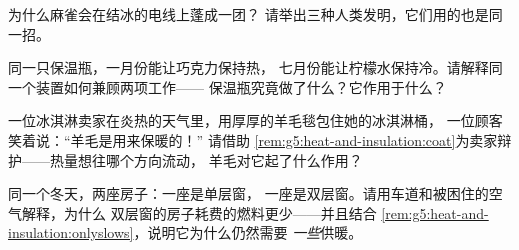 \begin{exercise}[$\star$]\label{exo:g5:heat-and-insulation:8}
为什么麻雀会在结冰的电线上蓬成一团？
请举出三种人类发明，它们用的也是同一招。
\end{exercise}

\begin{exercise}[$\star\star$]\label{exo:g5:heat-and-insulation:9}
同一只保温瓶，一月份能让巧克力保持热，
七月份能让柠檬水保持冷。请解释同一个装置如何兼顾两项工作——
保温瓶究竟做了什么？它作用于什么？
\end{exercise}

\begin{exercise}[$\star\star$]\label{exo:g5:heat-and-insulation:10}
一位冰淇淋卖家在炎热的天气里，用厚厚的羊毛毯包住她的冰淇淋桶，
一位顾客笑着说：“羊毛是用来保暖的！”
请借助
\cref{rem:g5:heat-and-insulation:coat}为卖家辩护——热量想往哪个方向流动，
羊毛对它起了什么作用？
\end{exercise}

\begin{exercise}[$\star\star$]\label{exo:g5:heat-and-insulation:11}
同一个冬天，两座房子：一座是单层窗，
一座是双层窗。请用车道和被困住的空气解释，为什么
双层窗的房子耗费的燃料更少——并且结合
\cref{rem:g5:heat-and-insulation:onlyslows}，说明它为什么仍然需要
\emph{一些}供暖。
\end{exercise}
